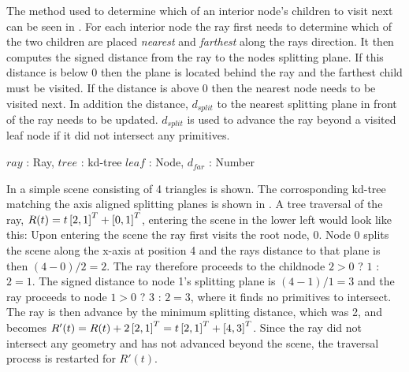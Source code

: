 
The method used to determine which of an interior node's children to visit next
can be seen in . For each interior node the ray
first needs to determine which of the two children are placed \textit{nearest}
and \textit{farthest} along the rays direction. It then computes the signed
distance from the ray to the nodes splitting plane. If this distance is below 0
then the plane is located behind the ray and the farthest child must be
visited. If the distance is above 0 then the nearest node needs to be visited
next. In addition the distance, $d_{split}$ to the nearest splitting plane in
front of the ray needs to be updated. $d_{split}$ is used to advance the ray
beyond a visited leaf node if it did not intersect any primitives.

\begin{algorithm}
  \caption{A basic kd-tree traversal algorithm}
  \label{alg:generelTraversal}
  \begin{algorithmic}
              {$ray$ : Ray, $tree$ : kd-tree}
              {$leaf$ : Node, $d_{far}$ : Number}{
                  \ELSE
                  \ENDIF
                \ENDWHILE
              }
  \end{algorithmic}
\end{algorithm}

In  a simple scene consisting of 4 triangles
is shown. The corrosponding kd-tree matching the axis aligned
splitting planes is shown in . A tree traversal
of the ray, $R(t) = t \left[2, 1 \right]^T + \left[0, 1 \right]^T$, entering the
scene in the lower left would look like this: Upon entering the scene
the ray first visits the root node, 0. Node 0 splits the scene along
the x-axis at position 4 and the rays distance to that plane is then
$(4 - 0) / 2 = 2$. The ray therefore proceeds to the childnode $2 > 0$ 
? $1$ : $2 = 1$. The signed distance to node 1's splitting plane is $(4 -
1) / 1 = 3$ and the ray proceeds to node $1 > 0$ ? $3$ : $2 = 3$, where it
finds no primitives to intersect. The ray is then advance by the
minimum splitting distance, which was 2, and becomes $R'(t) = R(t) + 2
\left[2, 1 \right]^T = t \left[2, 1 \right]^T + \left[4, 3 \right]^T$. Since the ray did
not intersect any geometry and has not advanced beyond the scene, the
traversal process is restarted for $R'(t)$.


